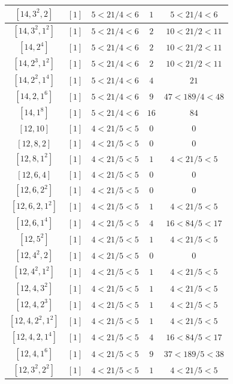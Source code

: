 \documentclass{article}%
\begin{document}
\begin{center}
\begin{longtable}{||c|c|c|c|c||}
$[14, 3^{2}, 2]$ & $[1]$ & $5 < 21/4 < 6$ & $1$ & $5 < 21/4 < 6$ \\ \hline 
$[14, 3^{2}, 1^{2}]$ & $[1]$ & $5 < 21/4 < 6$ & $2$ & $10 < 21/2 < 11$ \\ \hline 
$[14, 2^{4}]$ & $[1]$ & $5 < 21/4 < 6$ & $2$ & $10 < 21/2 < 11$ \\ \hline 
$[14, 2^{3}, 1^{2}]$ & $[1]$ & $5 < 21/4 < 6$ & $2$ & $10 < 21/2 < 11$ \\ \hline 
$[14, 2^{2}, 1^{4}]$ & $[1]$ & $5 < 21/4 < 6$ & $4$ & $21$ \\ \hline 
$[14, 2, 1^{6}]$ & $[1]$ & $5 < 21/4 < 6$ & $9$ & $47 < 189/4 < 48$ \\ \hline 
$[14, 1^{8}]$ & $[1]$ & $5 < 21/4 < 6$ & $16$ & $84$ \\ \hline 
$[12, 10]$ & $[1]$ & $4 < 21/5 < 5$ & $0$ & $0$ \\ \hline 
$[12, 8, 2]$ & $[1]$ & $4 < 21/5 < 5$ & $0$ & $0$ \\ \hline 
$[12, 8, 1^{2}]$ & $[1]$ & $4 < 21/5 < 5$ & $1$ & $4 < 21/5 < 5$ \\ \hline 
$[12, 6, 4]$ & $[1]$ & $4 < 21/5 < 5$ & $0$ & $0$ \\ \hline 
$[12, 6, 2^{2}]$ & $[1]$ & $4 < 21/5 < 5$ & $0$ & $0$ \\ \hline 
$[12, 6, 2, 1^{2}]$ & $[1]$ & $4 < 21/5 < 5$ & $1$ & $4 < 21/5 < 5$ \\ \hline 
$[12, 6, 1^{4}]$ & $[1]$ & $4 < 21/5 < 5$ & $4$ & $16 < 84/5 < 17$ \\ \hline 
$[12, 5^{2}]$ & $[1]$ & $4 < 21/5 < 5$ & $1$ & $4 < 21/5 < 5$ \\ \hline 
$[12, 4^{2}, 2]$ & $[1]$ & $4 < 21/5 < 5$ & $0$ & $0$ \\ \hline 
$[12, 4^{2}, 1^{2}]$ & $[1]$ & $4 < 21/5 < 5$ & $1$ & $4 < 21/5 < 5$ \\ \hline 
$[12, 4, 3^{2}]$ & $[1]$ & $4 < 21/5 < 5$ & $1$ & $4 < 21/5 < 5$ \\ \hline 
$[12, 4, 2^{3}]$ & $[1]$ & $4 < 21/5 < 5$ & $1$ & $4 < 21/5 < 5$ \\ \hline 
$[12, 4, 2^{2}, 1^{2}]$ & $[1]$ & $4 < 21/5 < 5$ & $1$ & $4 < 21/5 < 5$ \\ \hline 
$[12, 4, 2, 1^{4}]$ & $[1]$ & $4 < 21/5 < 5$ & $4$ & $16 < 84/5 < 17$ \\ \hline 
$[12, 4, 1^{6}]$ & $[1]$ & $4 < 21/5 < 5$ & $9$ & $37 < 189/5 < 38$ \\ \hline 
$[12, 3^{2}, 2^{2}]$ & $[1]$ & $4 < 21/5 < 5$ & $1$ & $4 < 21/5 < 5$ \\ \hline 

\end{longtable}
\end{center}
\end{document}
